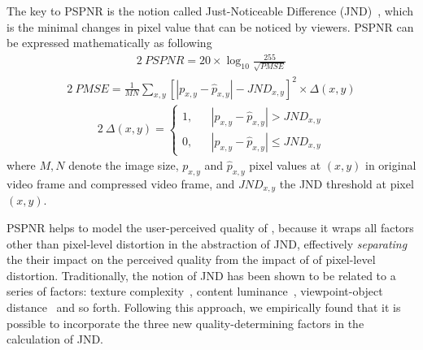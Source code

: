 The key to PSPNR is the notion called Just-Noticeable Difference (JND)~\cite{??}, which is the minimal changes in pixel value that can be noticed by viewers. 
PSPNR can be expressed mathematically as following
\vspace{-0.3cm}
\begin{alignat}{2}\
\label{eq:pspnr} PSPNR = 20 \times \log_{10}\frac{255}{\sqrt{PMSE}}
\end{alignat}
\vspace{-0.3cm}
\begin{alignat}{2}\
PMSE=\frac{1}{MN}\sum_{x,y}\left[ |p_{x,y} - \hat{p}_{x,y}| - JND_{x,y}\right]^2 \times \Delta (x, y)
\end{alignat}
\vspace{-0.3cm}
\begin{alignat}{2}\
\Delta (x, y) =\left\{
\begin{aligned}
1, & &|p_{x,y} - \hat{p}_{x,y}| > JND_{x,y} \\
0, & &|p_{x,y} - \hat{p}_{x,y}| \le JND_{x,y}
\end{aligned}
\right.
\end{alignat}
where $M,N$ denote the image size, $p_{x,y}$ and $\hat{p}_{x,y}$ pixel values at $(x, y)$ in original video frame and compressed video frame, and $JND_{x,y}$ the JND threshold at pixel $(x, y)$.

PSPNR helps to model the user-perceived quality of \vrvideos, because it wraps all factors other than pixel-level distortion in the abstraction of JND, effectively {\em separating} the their impact on the perceived quality from the impact of of pixel-level distortion. 
Traditionally, the notion of JND has been shown to be related to a series of factors: texture complexity~\cite{??}, content luminance~\cite{??}, viewpoint-object distance~\cite{??} and so forth.
Following this approach, we empirically found that it is possible to incorporate the three new quality-determining factors in the calculation of JND.



%
%


